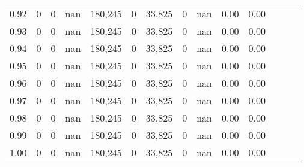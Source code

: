 \begin{tabular}{rrrrrrrrrrrrrr}
0.92 &      0 &    0 &   nan &  180,245 &        0 &  33,825 &       0 &   nan &  0.00 &      0.00 \\
0.93 &      0 &    0 &   nan &  180,245 &        0 &  33,825 &       0 &   nan &  0.00 &      0.00 \\
0.94 &      0 &    0 &   nan &  180,245 &        0 &  33,825 &       0 &   nan &  0.00 &      0.00 \\
0.95 &      0 &    0 &   nan &  180,245 &        0 &  33,825 &       0 &   nan &  0.00 &      0.00 \\
0.96 &      0 &    0 &   nan &  180,245 &        0 &  33,825 &       0 &   nan &  0.00 &      0.00 \\
0.97 &      0 &    0 &   nan &  180,245 &        0 &  33,825 &       0 &   nan &  0.00 &      0.00 \\
0.98 &      0 &    0 &   nan &  180,245 &        0 &  33,825 &       0 &   nan &  0.00 &      0.00 \\
0.99 &      0 &    0 &   nan &  180,245 &        0 &  33,825 &       0 &   nan &  0.00 &      0.00 \\
1.00 &      0 &    0 &   nan &  180,245 &        0 &  33,825 &       0 &   nan &  0.00 &      0.00 \\
\bottomrule
\end{tabular}
